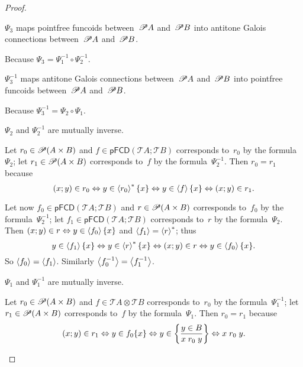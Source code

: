 \begin{proof}
\begin{claim}
$\Psi_3$ maps pointfree funcoids between~$\mathscr{P} A$ and~$\mathscr{P} B$ into antitone Galois connections between~$\mathscr{P} A$ and~$\mathscr{P} B$.
\end{claim}
\begin{claimproof}
Because $\Psi_3 = \Psi_1^{-1}\circ\Psi_2^{-1}$.
\end{claimproof}

\begin{claim}
$\Psi_3^{-1}$ maps antitone Galois connections between~$\mathscr{P} A$ and~$\mathscr{P} B$ into pointfree funcoids between~$\mathscr{P} A$ and~$\mathscr{P} B$.
\end{claim}
\begin{claimproof}
Because $\Psi_3^{-1} = \Psi_2\circ\Psi_1$.
\end{claimproof}

\begin{claim}
$\Psi_2$ and $\Psi_2^{-1}$ are mutually inverse.
\end{claim}
\begin{claimproof}
Let $r_{0}\in\mathscr{P}(A\times B)$ and $f\in\mathsf{pFCD}(\mathscr{T}A;\mathscr{T}B)$
corresponds to~$r_{0}$ by the formula~$\Psi_2$; let $r_{1}\in\mathscr{P}(A\times B)$
corresponds to~$f$ by the formula~$\Psi_2^{-1}$. Then $r_{0}=r_{1}$
because 
\[
(x;y)\in r_{0}\Leftrightarrow y\in\left\langle r_{0}\right\rangle ^{\ast}\{x\}\Leftrightarrow y\in\left\langle f\right\rangle\{x\}\Leftrightarrow(x;y)\in r_{1}.
\]

Let now $f_{0}\in\mathsf{pFCD}(\mathscr{T}A;\mathscr{T}B)$ and $r\in\mathscr{P}(A\times B)$
corresponds to~$f_{0}$ by the formula~$\Psi_2^{-1}$; let $f_{1}\in\mathsf{pFCD}(\mathscr{T}A;\mathscr{T}B)$
corresponds to~$r$ by the formula~$\Psi_2$. Then $(x;y)\in r\Leftrightarrow y\in\left\langle f_{0}\right\rangle\{x\}$
and $\left\langle f_{1}\right\rangle=\left\langle r\right\rangle ^{\ast}$; thus 
\[
y\in\left\langle f_{1}\right\rangle\{x\}\Leftrightarrow y\in\left\langle r\right\rangle ^{\ast}\{x\}\Leftrightarrow(x;y)\in r\Leftrightarrow y\in\left\langle f_{0}\right\rangle\{x\}.
\]
So $\left\langle f_{0}\right\rangle=\left\langle f_{1}\right\rangle$. Similarly $\left\langle f_{0}^{-1}\right\rangle=\left\langle f_{1}^{-1}\right\rangle$.
\end{claimproof}

\begin{claim}
$\Psi_1$ and $\Psi_1^{-1}$ are mutually inverse.
\end{claim}
\begin{claimproof}
Let $r_0\in\mathscr{P}(A\times B)$ and $f\in\mathscr{T}A\otimes\mathscr{T}B$  
corresponds to~$r_{0}$ by the formula~$\Psi_1^{-1}$; let $r_{1}\in\mathscr{P}(A\times B)$
corresponds to~$f$ by the formula~$\Psi_1$. Then $r_{0}=r_{1}$ because
\[
(x;y)\in r_1 \Leftrightarrow y\in f_0\{x\} \Leftrightarrow y\in\left\{ \frac{y\in B}{x\mathrel{r_0}y}\right\} \Leftrightarrow x\mathrel{r_0}y.
\]


\end{claimproof}
\end{proof}

